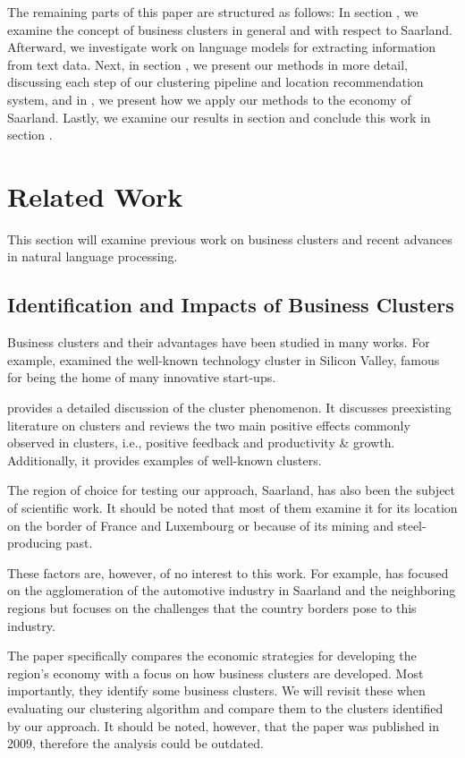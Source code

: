 \documentclass[conference]{IEEEtran}
\begin{document}
The remaining parts of this paper are structured as follows: In section \MakeUppercase{}, we examine the concept of business clusters in general and with respect to Saarland. Afterward, we investigate work on language models for extracting information from text data. Next, in section \MakeUppercase{}, we present our methods in more detail, discussing each step of our clustering pipeline and location recommendation system, and in \MakeUppercase{}, we present how we apply our methods to the economy of Saarland. Lastly, we examine our results in section \MakeUppercase{} and conclude this work in section \MakeUppercase{}.

\section{Related Work}
This section will examine previous work on business clusters and recent advances in natural language processing.

\subsection{Identification and Impacts of Business Clusters}

Business clusters and their advantages have been studied in many works. For example, \cite{regionaladv} examined the well-known technology cluster in Silicon Valley, famous for being the home of many innovative start-ups. 

\cite{clustertheory} provides a detailed discussion of the cluster phenomenon. It discusses preexisting literature on clusters and reviews the two main positive effects commonly observed in clusters, i.e., positive feedback and productivity \& growth. Additionally, it provides examples of well-known clusters.

The region of choice for testing our approach, Saarland, has also been the subject of scientific work. It should be noted that most of them examine it for its location on the border of France and Luxembourg or because of its mining and steel-producing past.

These factors are, however, of no interest to this work. For example, \cite{saarlandeco1} has focused on the agglomeration of the automotive industry in Saarland and the neighboring regions but focuses on the challenges that the country borders pose to this industry.

The paper \cite{saarlandeco2} specifically compares the economic strategies for developing the region's economy with a focus on how business clusters are developed. Most importantly, they identify some business clusters. We will revisit these when evaluating our clustering algorithm and compare them to the clusters identified by our approach. It should be noted, however, that the paper was published in 2009, therefore the analysis could be outdated.
\end{document}

